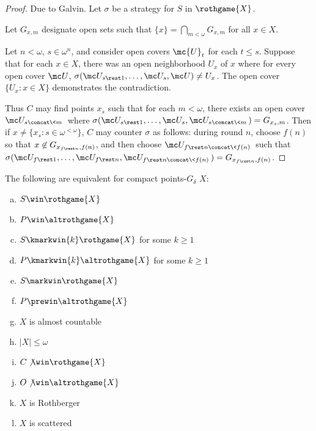   \begin{proof}

    Due to Galvin. Let $\sigma$ be a strategy for $S$ in $\rothgame{X}$.

    Let $G_{x,m}$ designate open sets such that $\{x\}=\bigcap_{m<\omega}G_{x,m}$ for all $x\in X$.

    Let $n<\omega$, $s\in\omega^{n}$, and consider open covers $\mc{U}_t$ for each $t\leq s$. Suppose that for each $x\in X$, there was an open neighborhood $U_x$ of $x$ where for every open cover $\mc U$, $\sigma(\mc U_{s\rest 1},\dots,\mc U_{s},\mc U)\not=U_x$. The open cover $\{U_x : x\in X\}$ demonstrates the contradiction.

    Thus $C$ may find points $x_s$ such that for each $m<\omega$, there exists an open cover $\mc U_{s\concat\<m\>}$ where $\sigma(\mc U_{s\rest 1},\dots,\mc U_{s},\mc U_{s\concat\<m\>})=G_{x_s,m}$. Then if $x\not=\{x_s : s\in\omega^{<\omega}\}$, $C$ may counter $\sigma$ as follows: during round $n$, choose $f(n)$ so that $x\not\in G_{x_{f\rest n},f(n)}$, and then choose $\mc U_{f\rest n\concat\<f(n)\>}$ such that $\sigma(\mc U_{f\rest 1},\dots,\mc U_{f\rest n},\mc U_{f\rest n\concat\<f(n)\>})=G_{x_{f\rest n},f(n)}$.
  \end{proof} 

  \begin{cor}
    The following are equivalent for compact points-$G_\delta$ $X$:
      \begin{enumerate}[(a)]
        \item $S\win\rothgame{X}$
        \item $P\win\altrothgame{X}$
        \item $S\kmarkwin{k}\rothgame{X}$ for some $k\geq 1$
        \item $P\kmarkwin{k}\altrothgame{X}$ for some $k\geq 1$
        \item $S\markwin\rothgame{X}$
        \item $P\prewin\altrothgame{X}$
        \item $X$ is almost countable
        \item $|X|\leq\omega$
        \item $C\not\win\rothgame{X}$
        \item $O\not\win\altrothgame{X}$
        \item $X$ is Rothberger
        \item $X$ is scattered
      \end{enumerate}
  \end{cor}

